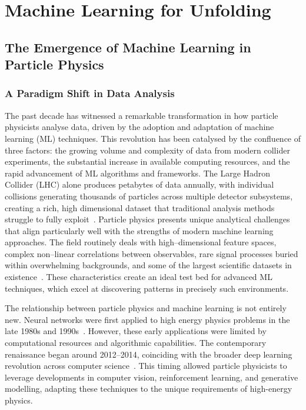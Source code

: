\chapter{Machine Learning for Unfolding}
\label{chap:ml-for-unfolding}
\section{The Emergence of Machine Learning in Particle Physics}
\subsection{A Paradigm Shift in Data Analysis}
The past decade has witnessed a remarkable transformation in how particle physicists analyse data, driven by the adoption and adaptation of machine learning (ML) techniques.
%
This revolution has been catalysed by the confluence of three factors: the growing volume and complexity of data from modern collider experiments, the substantial increase in available computing resources, and the rapid advancement of ML algorithms and frameworks.
%
The Large Hadron Collider (LHC) alone produces petabytes of data annually, with individual collisions generating thousands of particles across multiple detector subsystems, creating a rich, high dimensional dataset that traditional analysis methods struggle to fully exploit~\cite{EnvironmentalCERN}.
%
Particle physics presents unique analytical challenges that align particularly well with the strengths of modern machine learning approaches.
%
The field routinely deals with high--dimensional feature spaces, complex non--linear correlations between observables, rare signal processes buried within overwhelming backgrounds, and some of the largest scientific datasets in existence~\cite{DiMeglio2017SubmitterResearch}.
%
These characteristics create an ideal test bed for advanced ML techniques, which excel at discovering patterns in precisely such environments.
%

The relationship between particle physics and machine learning is not entirely new.
%
Neural networks were first applied to high energy physics problems in the late 1980s and 1990s~\cite{Teodorescu2008ArtificialPhysics}.
%
However, these early applications were limited by computational resources and algorithmic capabilities.
%
The contemporary renaissance began around 2012--2014, coinciding with the broader deep learning revolution across computer science~\cite{TerrenceJ.Sejnowski2018TheIntelligence}.
%
This timing allowed particle physicists to leverage developments in computer vision, reinforcement learning, and generative modelling, adapting these techniques to the unique requirements of high-energy physics.
